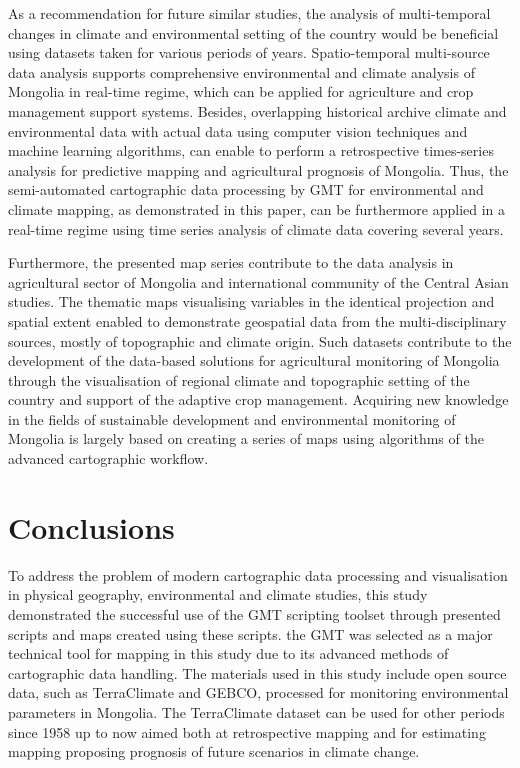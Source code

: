 \documentclass[geosciences,article,submit,pdftex,moreauthors]{Definitions/mdpi}
\begin{document}
As a recommendation for future similar studies, the analysis of multi-temporal changes in climate and environmental setting of the country would be beneficial using datasets taken for various periods of years. Spatio-temporal multi-source data analysis supports comprehensive environmental and climate analysis of Mongolia in real-time regime, which can be applied for agriculture and crop management support systems. Besides, overlapping historical archive climate and environmental data with actual data using computer vision techniques and machine learning algorithms, can enable to perform a retrospective times-series analysis for predictive mapping and agricultural prognosis of Mongolia. Thus, the semi-automated cartographic data processing by GMT for environmental and climate mapping, as demonstrated in this paper, can be furthermore applied in a real-time regime using time series analysis of climate data covering several years.  

Furthermore, the presented map series contribute to the data analysis in agricultural sector of Mongolia and international community of the Central Asian studies. The thematic maps visualising variables in the identical projection and spatial extent enabled to demonstrate geospatial data from the multi-disciplinary sources, mostly of topographic and climate origin. Such datasets contribute to the development of the data-based solutions for agricultural monitoring of Mongolia through the visualisation of regional climate and topographic setting of the country and support of the adaptive crop management. Acquiring new knowledge in the fields of sustainable development and environmental monitoring of Mongolia is largely based on creating a series of maps using algorithms of the advanced cartographic workflow.

\section{Conclusions}

To address the problem of modern cartographic data processing and visualisation in physical geography, environmental and climate studies, this study demonstrated the successful use of the GMT scripting toolset through presented scripts and maps created using these scripts. the GMT was selected as a major technical tool for mapping in this study due to its advanced methods of cartographic data handling. The materials used in this study include open source data, such as TerraClimate and GEBCO, processed for monitoring environmental parameters in Mongolia. The TerraClimate dataset can be used for other periods since 1958 up to now aimed both at retrospective mapping and for estimating mapping proposing prognosis of future scenarios in climate change. 
\end{document}
